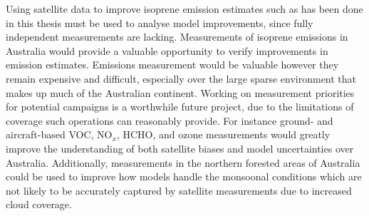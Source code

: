   Using satellite data to improve isoprene emission estimates such as has been done in this thesis must be used to analyse model improvements, since fully independent measurements are lacking.
  Measurements of isoprene emissions in Australia would provide a valuable opportunity to verify improvements in emission estimates.
  Emissions measurement would be valuable however they remain expensive and difficult, especially over the large sparse environment that makes up much of the Australian continent.
  Working on measurement priorities for potential campaigns is a worthwhile future project, due to the limitations of coverage such operations can reasonably provide.
  For instance ground- and aircraft-based VOC, NO$_x$, HCHO, and ozone measurements would greatly improve the understanding of both satellite biases and model uncertainties over Australia.
  Additionally, measurements in the northern forested areas of Australia could be used to improve how models handle the monsoonal conditions which are not likely to be accurately captured by satellite measurements due to increased cloud coverage.


